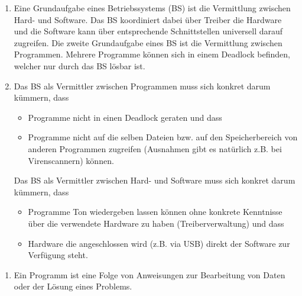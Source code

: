 \documentclass[ngerman]{fbi-aufgabenblatt}
\begin{document}



\begin{enumerate}
	\item Eine Grundaufgabe eines Betriebssystems (BS) ist die Vermittlung zwischen Hard- und Software. Das BS koordiniert dabei über Treiber die Hardware und die Software kann über entsprechende Schnittstellen universell darauf zugreifen.
	Die zweite Grundaufgabe eines BS ist die Vermittlung zwischen Programmen. Mehrere Programme können sich in einem Deadlock befinden, welcher nur durch das BS lösbar ist.
	
	\item Das BS als Vermittler zwischen Programmen muss sich konkret darum kümmern, dass
	\begin{itemize}
		\item Programme nicht in einen Deadlock geraten und dass
		\item Programme nicht auf die selben Dateien bzw. auf den Speicherbereich von anderen Programmen zugreifen (Ausnahmen gibt es natürlich z.B. bei Virenscannern) können.
	\end{itemize}
	Das BS als Vermittler zwischen Hard- und Software muss sich konkret
darum kümmern, dass
	\begin{itemize}
		\item Programme Ton wiedergeben lassen können ohne konkrete Kenntnisse über die verwendete Hardware zu haben (Treiberverwaltung) und dass
		\item Hardware die angeschlossen wird (z.B. via USB) direkt der Software zur Verfügung steht.
	\end{itemize}
\end{enumerate}


\begin{enumerate}
	\item Ein Programm ist eine Folge von Anweisungen zur Bearbeitung von Daten oder der Lösung eines Problems.
\end{enumerate}
%
\end{document}
